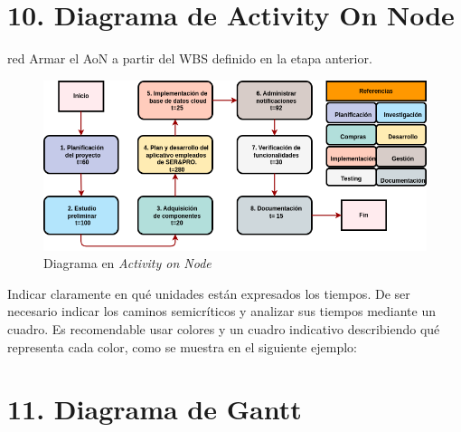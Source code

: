 \documentclass[
11pt, %
]{charter}
\begin{document}
\section{10. Diagrama de Activity On Node}
\label{sec:AoN}

\begin{consigna}{red}
Armar el AoN a partir del WBS definido en la etapa anterior. 



\end{consigna}

\begin{figure}[htpb]
\centering 
\includegraphics[width=.8\textwidth]{./Figuras/AoN.png}
\caption{Diagrama en \textit{Activity on Node}}
\label{fig:AoN}
\end{figure}

Indicar claramente en qué unidades están expresados los tiempos.
De ser necesario indicar los caminos semicríticos y analizar sus tiempos mediante un cuadro.
Es recomendable usar colores y un cuadro indicativo describiendo qué representa cada color, como se muestra en el siguiente ejemplo:



\section{11. Diagrama de Gantt}
\label{sec:gantt}
\end{document}

